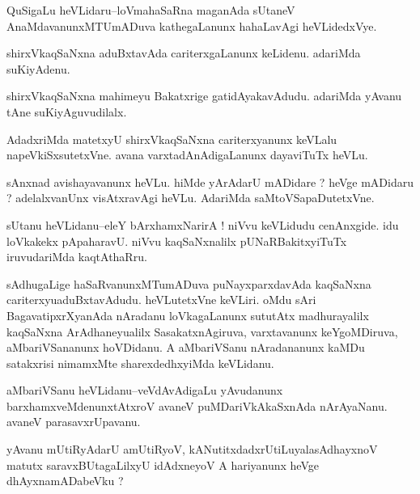\documentclass{article}
\begin{document}

\begin{mn}%
QuSigaLu heVLidaru--loVmahaSaRna maganAda sUtaneV AnaMdavanunxMTUmADuva kathegaLanunx 
hahaLavAgi heVLidedxVye.
\end{mn}

\begin{mn}%
shirxVkaqSaNxna aduBxtavAda cariterxgaLanunx keLidenu. adariMda suKiyAdenu.
\end{mn}

\begin{mn}%
shirxVkaqSaNxna mahimeyu Bakatxrige gatidAyakavAdudu. adariMda yAvanu tAne suKiyAguvudilalx.
\end{mn}

\begin{mn}%
AdadxriMda matetxyU shirxVkaqSaNxna cariterxyanunx keVLalu napeVkiSxsutetxVne. avana 
varxtadAnAdigaLanunx dayaviTuTx heVLu.
\end{mn}

\begin{mn}%
sAnxnad avishayavanunx heVLu. hiMde yArAdarU mADidare ? heVge mADidaru ? adelalxvanUnx 
visAtxravAgi heVLu. AdariMda saMtoVSapaDutetxVne.
\end{mn}

\begin{mn}%
sUtanu heVLidanu--eleY bArxhamxNarirA ! niVvu keVLidudu cenAnxgide. idu loVkakekx 
pApaharavU. niVvu kaqSaNxnalilx pUNaRBakitxyiTuTx iruvudariMda kaqtAthaRru.
\end{mn}

\begin{mn}%
sAdhugaLige haSaRvanunxMTumADuva puNayxparxdavAda kaqSaNxna cariterxyuaduBxtavAdudu. 
heVLutetxVne keVLiri. oMdu sAri BagavatipxrXyanAda nAradanu loVkagaLanunx sututAtx 
madhurayalilx kaqSaNxna ArAdhaneyualilx SasakatxnAgiruva, varxtavanunx keYgoMDiruva,  
aMbariVSananunx hoVDidanu. A aMbariVSanu nAradananunx kaMDu satakxrisi nimamxMte 
sharexdedhxyiMda keVLidanu.
\end{mn}

\begin{mn}%
aMbariVSanu heVLidanu--veVdAvAdigaLu yAvudanunx barxhamxveMdenunxtAtxroV avaneV 
puMDariVkAkaSxnAda nArAyaNanu. avaneV parasavxrUpavanu.
\end{mn}

\begin{mn}%
yAvanu mUtiRyAdarU amUtiRyoV, kANutitxdadxrUtiLuyalasAdhayxnoV matutx saravxBUtagaLilxyU 
idAdxneyoV A hariyanunx heVge dhAyxnamADabeVku ?
\end{mn}
\end{document}
